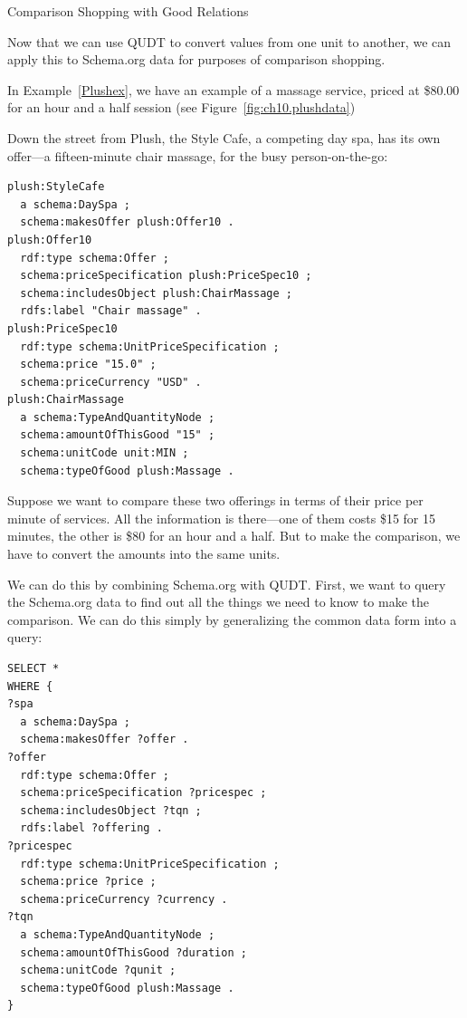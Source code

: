 \begin{challenge}{Comparison Shopping with Good Relations}
\label{chal:38}

Now that we can use QUDT to convert values from one unit to another, we
can apply this to Schema.org data for purposes of comparison
shopping.

In Example~\ref{Plushex}, we have an example of a massage
service, priced at \$80.00 for an hour and a half session (see Figure~\ref{fig:ch10.plushdata})

Down the street from Plush, the Style Cafe, a competing day spa, has 
its own offer---a
fifteen-minute chair massage, for the busy person-on-the-go:

\begin{lstlisting}
plush:StyleCafe
  a schema:DaySpa ;
  schema:makesOffer plush:Offer10 .
plush:Offer10
  rdf:type schema:Offer ;
  schema:priceSpecification plush:PriceSpec10 ;
  schema:includesObject plush:ChairMassage ;
  rdfs:label "Chair massage" .
plush:PriceSpec10
  rdf:type schema:UnitPriceSpecification ;
  schema:price "15.0" ;
  schema:priceCurrency "USD" .
plush:ChairMassage
  a schema:TypeAndQuantityNode ;
  schema:amountOfThisGood "15" ;
  schema:unitCode unit:MIN ;  
  schema:typeOfGood plush:Massage .
\end{lstlisting}



Suppose we want to compare these two offerings in terms of their price
per minute of services. All the information is there---one of them costs
\$15 for 15 minutes, the other is \$80 for an hour and a half. But to
make the comparison, we have to convert the amounts into the same units.

We can do this by combining Schema.org with QUDT. First, we want to
query the Schema.org data to find out all the things we need to know
to make the comparison. We can do this simply by generalizing the common
data form into a query:

\begin{lstlisting}
SELECT * 
WHERE {
?spa
  a schema:DaySpa ;
  schema:makesOffer ?offer .
?offer
  rdf:type schema:Offer ;
  schema:priceSpecification ?pricespec ;
  schema:includesObject ?tqn ;
  rdfs:label ?offering .
?pricespec
  rdf:type schema:UnitPriceSpecification ;
  schema:price ?price ;
  schema:priceCurrency ?currency .
?tqn
  a schema:TypeAndQuantityNode ;
  schema:amountOfThisGood ?duration ;
  schema:unitCode ?qunit ;  
  schema:typeOfGood plush:Massage .
}
\end{lstlisting}


\end{challenge}
